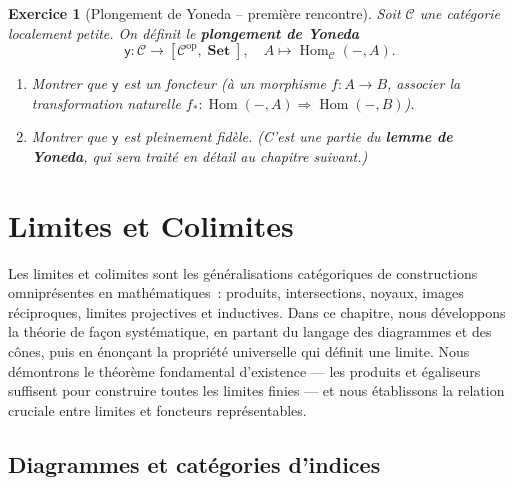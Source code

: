 \documentclass[a4paper,12pt]{book}
\DeclareMathOperator{\Hom}{Hom}
\DeclareMathOperator{\Set}{\mathbf{Set}}
\newcommand{\op}{\mathrm{op}}
\newtheorem{exercice}{Exercice}[chapter]
\begin{document}
\begin{exercice}[Plongement de Yoneda -- première rencontre]\label{exo:yoneda-intro}
Soit $\mathcal{C}$ une catégorie localement petite. On définit le \textbf{plongement de Yoneda}
\[
  \mathsf{y} : \mathcal{C} \longrightarrow [\mathcal{C}^{\op}, \Set], \quad A \longmapsto \Hom_\mathcal{C}(-, A).
\]
\begin{enumerate}[label=(\alph*)]
  \item Montrer que $\mathsf{y}$ est un foncteur (à un morphisme $f : A \to B$, associer la transformation naturelle $f_* : \Hom(-, A) \Rightarrow \Hom(-, B)$).
  \item Montrer que $\mathsf{y}$ est pleinement fidèle. (C'est une partie du \textbf{lemme de Yoneda}, qui sera traité en détail au chapitre suivant.)
\end{enumerate}
\end{exercice}


\chapter{Limites et Colimites}\label{ch:limites-colimites}
\minitoc

\vspace{1em}

Les limites et colimites sont les généralisations catégoriques de
constructions omniprésentes en mathématiques~: produits, intersections,
noyaux, images réciproques, limites projectives et inductives.
Dans ce chapitre, nous développons la théorie de façon systématique,
en partant du langage des diagrammes et des cônes, puis en énonçant
la propriété universelle qui définit une limite. Nous démontrons
le théorème fondamental d'existence --- les produits et égaliseurs
suffisent pour construire toutes les limites finies --- et nous
établissons la relation cruciale entre limites et foncteurs
représentables.


\section{Diagrammes et catégories d'indices}\label{sec:diagrammes}
\end{document}
